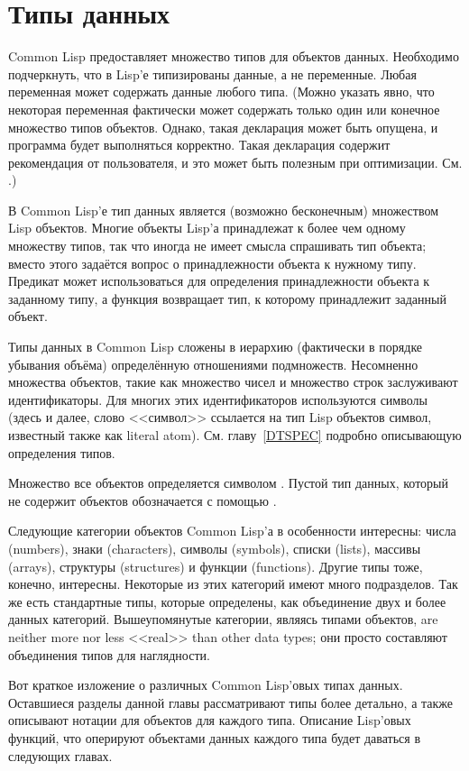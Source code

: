 \chapter{Типы данных}
\label{DTYPES}

Common Lisp предоставляет множество типов для объектов
данных. Необходимо подчеркнуть, что в Lisp'е типизированы данные,
а не переменные. Любая переменная может содержать данные любого
типа. (Можно указать явно, что некоторая переменная фактически
может содержать только один или конечное множество типов
объектов. Однако, такая декларация может быть опущена, и программа
будет выполняться корректно. Такая декларация содержит
рекомендация от пользователя, и это может быть полезным при
оптимизации. См. .)

В Common Lisp'е тип данных является (возможно бесконечным)
множеством Lisp объектов. Многие объекты Lisp'а принадлежат к
более чем одному множеству типов, так что иногда не имеет смысла
спрашивать тип объекта; вместо этого задаётся вопрос о
принадлежности объекта к нужному типу. Предикат  может
использоваться для определения принадлежности объекта к заданному
типу, а функция  возвращает тип, к которому
принадлежит заданный объект.

Типы данных в Common Lisp сложены в иерархию (фактически в порядке
убывания объёма) определённую отношениями подмножеств. Несомненно
множества объектов, такие как множество чисел и множество строк
заслуживают идентификаторы. Для многих этих идентификаторов
используются символы (здесь и далее, слово <<символ>> ссылается на
тип Lisp объектов символ, известный также как literal
atom). См. главу~\ref{DTSPEC} подробно описывающую определения
типов. 

Множество все объектов определяется символом {\true}. Пустой тип
данных, который не содержит объектов обозначается с помощью
{\nil}. 

Следующие категории объектов Common Lisp'а в особенности
интересны: числа (numbers), знаки (characters), символы (symbols),
списки (lists), массивы (arrays), структуры (structures) и функции
(functions). Другие типы тоже, конечно, интересны. Некоторые из
этих категорий имеют много подразделов. Так же есть стандартные
типы, которые определены, как объединение двух и более данных
категорий. Вышеупомянутые категории, являясь типами объектов, are
neither more nor less <<real>> than other data types; они просто
составляют объединения типов для наглядности. 

Вот краткое изложение о различных Common Lisp'овых типах
данных. Оставшиеся разделы данной главы рассматривают типы более
детально, а также описывают нотации для объектов для каждого
типа. Описание Lisp'овых функций, что оперируют объектами данных
каждого типа будет даваться в следующих главах. 

